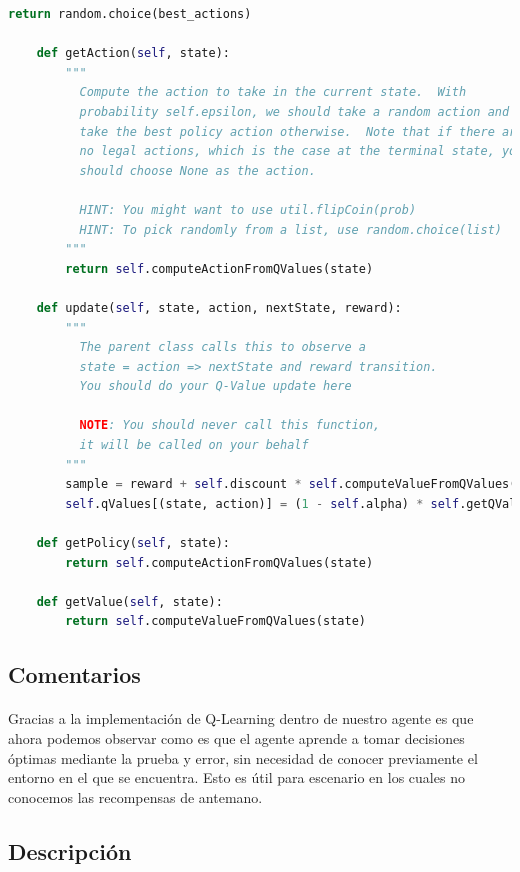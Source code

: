 \documentclass{report}
\begin{document}
\begin{lstlisting}[language=Python, caption=Q-Learning]
        return random.choice(best_actions)

    def getAction(self, state):
        """
          Compute the action to take in the current state.  With
          probability self.epsilon, we should take a random action and
          take the best policy action otherwise.  Note that if there are
          no legal actions, which is the case at the terminal state, you
          should choose None as the action.

          HINT: You might want to use util.flipCoin(prob)
          HINT: To pick randomly from a list, use random.choice(list)
        """
        return self.computeActionFromQValues(state)

    def update(self, state, action, nextState, reward):
        """
          The parent class calls this to observe a
          state = action => nextState and reward transition.
          You should do your Q-Value update here

          NOTE: You should never call this function,
          it will be called on your behalf
        """
        sample = reward + self.discount * self.computeValueFromQValues(nextState)
        self.qValues[(state, action)] = (1 - self.alpha) * self.getQValue(state, action) + self.alpha * sample

    def getPolicy(self, state):
        return self.computeActionFromQValues(state)

    def getValue(self, state):
        return self.computeValueFromQValues(state)

\end{lstlisting}
      \subsection*{Comentarios}
        \paragraph*{}{
          Gracias a la implementación de Q-Learning dentro de nuestro agente es que ahora podemos observar como es que el agente aprende a tomar decisiones óptimas mediante la prueba y error, sin necesidad de conocer previamente el entorno en el que se encuentra. Esto es útil para escenario en los cuales no conocemos las recompensas de antemano.
        }
      \subsection*{Descripción}
\end{document}

